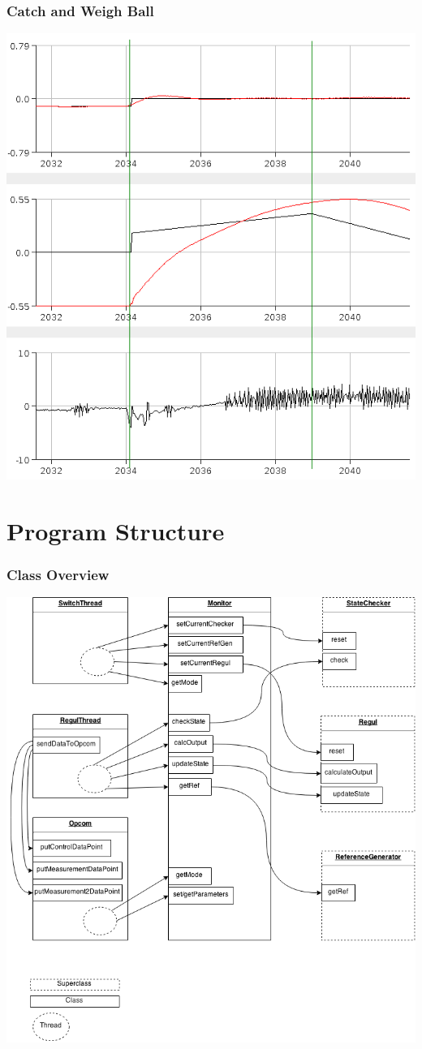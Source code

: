 \documentclass[
compress]
{beamer}
\begin{document}
\begin{frame}
\frametitle{Catch and Weigh Ball}
\centering
\includegraphics[height=0.83\textheight]{figures/weighmediumball-crop.png}
\end{frame}

\section{Program Structure}
\frame{\sectionpage}
\begin{frame}
\frametitle{Class Overview}
\centering
\includegraphics[height=0.83\textheight]{figures/UML.png}
\end{frame}
\end{document}
